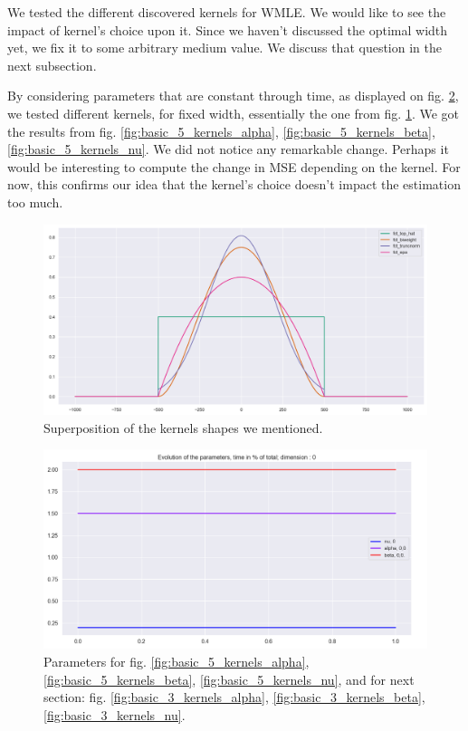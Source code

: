 We tested the different discovered kernels for WMLE. We would like to see the impact of kernel's choice upon it. Since we haven't discussed the optimal width yet, we fix it to some arbitrary medium value. We discuss that question in the next subsection.

By considering parameters that are constant through time, as displayed on fig. \ref{fig:evol_choice_basic}, we tested different kernels, for fixed width, essentially the one from fig. \ref{fig:kernels_list}. We got the results from fig. \ref{fig:basic_5_kernels_alpha}, \ref{fig:basic_5_kernels_beta}, \ref{fig:basic_5_kernels_nu}. We did not notice any remarkable change. Perhaps it would be interesting to compute the change in MSE depending on the kernel. For now, this confirms our idea that the kernel's choice doesn't impact the estimation too much.


\begin{figure}
\centering
\includegraphics[width = 0.80 \textwidth]{../imag/chap3/the_kernels.png}
\caption{Superposition of the kernels shapes we mentioned.}
\label{fig:kernels_list}
\end{figure}


\begin{figure}
\centering
\includegraphics[width = 0.75 \textwidth]{../imag/chap3/compar_kernel/evol_param.png}
\caption{Parameters for fig. \ref{fig:basic_5_kernels_alpha}, \ref{fig:basic_5_kernels_beta}, \ref{fig:basic_5_kernels_nu}, and for next section: fig. \ref{fig:basic_3_kernels_alpha}, \ref{fig:basic_3_kernels_beta}, \ref{fig:basic_3_kernels_nu}. }
\label{fig:evol_choice_basic}
\end{figure}


